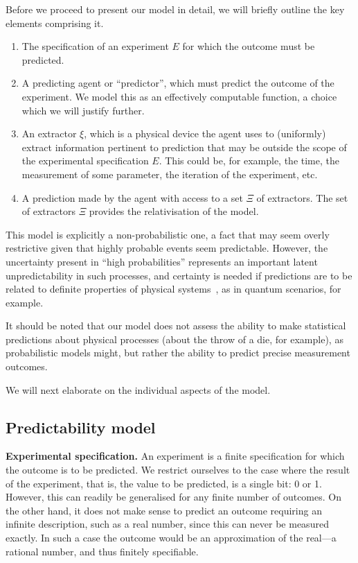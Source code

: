 \documentclass[information,article,submit,moreauthors,pdftex,12pt,a4paper]{mdpi}
\theoremstyle{mdpi}
\newcounter{ex}
\newcounter{re}
\theoremstyle{mdpidefinition}
\begin{document}
Before we proceed to present our model in detail, we will briefly outline the key elements comprising it.
\begin{enumerate}
	\item The specification of an experiment $E$ for which the outcome must be predicted.
	\item A predicting agent or ``predictor'', which must predict the outcome of the experiment.
	We model this as an effectively computable function, a choice which we will justify further.
	\item An extractor $\xi$, which is a physical device the agent uses to (uniformly) extract information pertinent to prediction that may be outside the scope of the experimental specification $E$. This could be, for example, the time, the measurement of some parameter, the iteration of the experiment, etc.
	\item A prediction made by the agent with access to a set $\Xi$ of extractors. The set of extractors $\Xi$ provides the relativisation of the model.
\end{enumerate}

This model is explicitly a non-probabilistic one, a fact that may seem overly restrictive given that highly probable events seem predictable.
However, the uncertainty present in ``high probabilities'' represents an important latent unpredictability in such processes, and certainty is needed if predictions are to be related to definite properties of physical systems~\cite{epr}, as
in quantum scenarios, for example.

It should be noted that our model does not assess the ability to make statistical predictions about physical processes (about the throw of a die, for example), as probabilistic models might, but rather the ability to predict precise measurement outcomes.

We will next elaborate on the individual aspects of the model.

\subsection{Predictability model}

\textbf{Experimental specification.}
An experiment is a finite specification for which the outcome is to be predicted.
We restrict ourselves to the case where the result of the experiment, that is, the value to be predicted, is a single bit: 0 or 1.
However, this can readily be generalised for any finite number of outcomes.
On the other hand, it does not make sense to predict an outcome requiring an infinite description, such as a real number, since this can never be measured exactly.
In such a case the outcome would be an approximation of the real---a rational number, and thus finitely specifiable.
\end{document}
